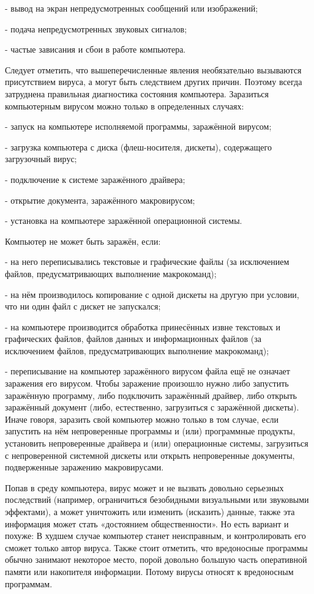- вывод на экран непредусмотренных сообщений или изображений; 

- подача непредусмотренных звуковых сигналов;
 
- частые зависания и сбои в работе компьютера. 

Следует отметить, что вышеперечисленные явления необязательно вызываются присутствием вируса, а могут быть следствием других причин. Поэтому всегда затруднена правильная диагностика состояния компьютера. Заразиться компьютерным вирусом можно только в определенных случаях: 

- запуск на компьютере исполняемой программы, заражённой вирусом; 

- загрузка компьютера с диска (флеш-носителя, дискеты), содержащего загрузочный вирус; 

- подключение к системе заражённого драйвера; 

- открытие документа, заражённого макровирусом; 

- установка на компьютере заражённой операционной системы. 

Компьютер не может быть заражён, если: 

- на него переписывались текстовые и графические файлы (за исключением файлов, предусматривающих выполнение макрокоманд); 

- на нём производилось копирование с одной дискеты на другую при условии, что ни один файл с дискет не запускался; 

- на компьютере производится обработка принесённых извне текстовых и графических файлов, файлов данных и информационных файлов (за исключением файлов, предусматривающих выполнение макрокоманд); 

- переписывание на компьютер заражённого вирусом файла ещё не означает заражения его вирусом. Чтобы заражение произошло нужно либо запустить заражённую программу, либо подключить заражённый драйвер, либо открыть заражённый документ (либо, естественно, загрузиться с заражённой дискеты). Иначе говоря, заразить свой компьютер можно только в том случае, если запустить на нём непроверенные программы и (или) программные продукты, установить непроверенные драйвера и (или) операционные системы, загрузиться с непроверенной системной дискеты или открыть непроверенные документы, подверженные заражению макровирусами. 

Попав в среду компьютера, вирус может и не вызвать довольно серьезных последствий (например, ограничиться безобидными визуальными или звуковыми эффектами), а может уничтожить или изменить (исказить) данные, также эта информация может стать «достоянием общественности».  Но есть вариант и похуже: В худшем случае компьютер станет неисправным, и контролировать его сможет только автор вируса. Также стоит отметить, что вредоносные программы обычно занимают некоторое место, порой довольно большую часть оперативной памяти или накопителя информации. Потому вирусы относят к вредоносным программам.

